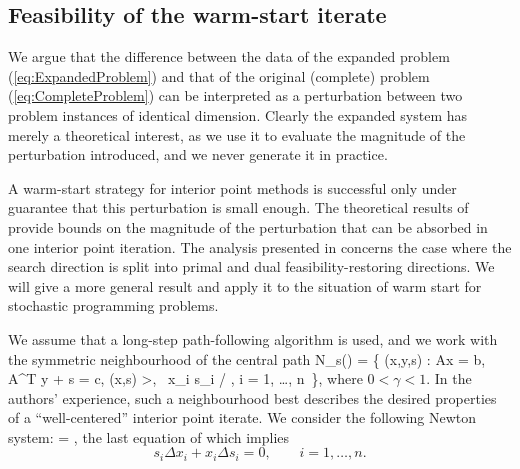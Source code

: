 %
%
\subsection{Feasibility of the warm-start iterate}

We argue that the difference between the data of the expanded 
problem (\ref{eq:ExpandedProblem}) and that of the original (complete) 
problem (\ref{eq:CompleteProblem}) can be interpreted as a perturbation 
between two problem instances of identical dimension. 
Clearly the expanded system has merely a theoretical
interest, as we use it to evaluate the magnitude of the 
perturbation introduced, and we never generate it in practice.

A warm-start strategy for interior point methods is successful only
under guarantee that this perturbation is small enough. The 
theoretical results of \cite{YildirimWright,GondzioGrothey03} provide 
bounds on the magnitude of the perturbation that can be absorbed 
in one interior point iteration. 
The analysis presented in \cite{GondzioGrothey03} concerns the case
where the search direction is split into primal and dual 
feasibility-restoring directions. 
We will give a more general result and apply it to the situation 
of warm start for stochastic programming problems.

We assume that a long-step path-following algorithm is used, 
and we work with the symmetric neighbourhood \cite{ColomboGondzio05}
of the central path 
%
\be \label{N8hood}
N_s(\gamma) = \{ (x,y,s) : Ax = b,\: A^T y + s = c,\: (x,s) \!>, \, 
  \gamma \mu \leq\! x_i s_i \leq\! \mu / \gamma, \;\; i = 1, \ldots, n \,\}, 
\ee
%
where $0 < \gamma < 1$. 
In the authors' experience, such a neighbourhood best describes the desired 
properties of a ``well-centered'' interior point iterate.
%
We consider the following Newton system:
\be \label{eq:NewtonSystem2}
 = 
\left[ \begin{array}{c}
    \xi_b \\ \xi_c \\ 0
  \end{array} \right],
\ee
the last equation of which implies
\[
 s_i\Delta x_i + x_i\Delta s_i = 0, \qquad i = 1, \ldots, n.
\]


